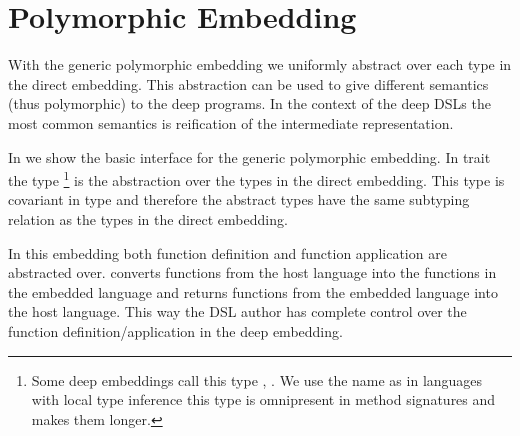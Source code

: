\section{Polymorphic Embedding}
\label{sec:polymorphic-embedding}

With the generic polymorphic embedding we uniformly abstract over each type in the
 direct embedding. This abstraction can be used to give different semantics
 (thus polymorphic) to the deep programs. In the context of the deep DSLs the most
 common semantics is reification of the intermediate representation.

In  we show the basic interface
 for the generic polymorphic embedding. In trait
  the type \footnote{Some deep
 embeddings call this type , . We use the name  as in
 languages with local type inference this type is omnipresent in method signatures and makes them longer.} is the abstraction over the types in the direct embedding. This type is covariant in type 
 and therefore the abstract types have the same subtyping relation as the types
 in the direct embedding.

In this embedding both function definition and function application are abstracted over.
  converts functions from the host language into the functions in the embedded language and
  returns functions from the embedded language into the host language. This way the DSL author
 has complete control over the function definition/application in the deep embedding.

